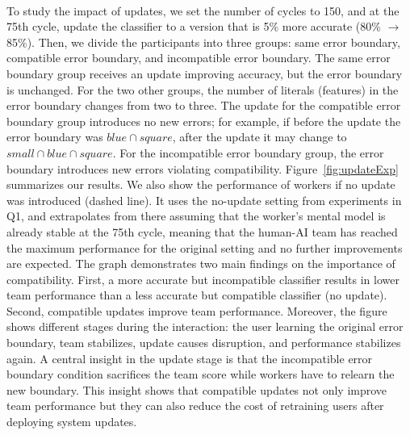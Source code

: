 \documentclass[letterpaper]{article} %
\newcommand{\bug}
    {\mbox{\rule{2mm}{2mm}}}
\newcommand{\Bug}[1]
    {\bug \footnote{BUG: {#1}}}
\newcommand{\?}{\mbox{?}}
\begin{document}
\\
\noindent To study the impact of updates, we set the number of cycles to 150, and at the 75th cycle, update the classifier to a version that is 5\% more accurate (80\% $\rightarrow$ 85\%). Then, we divide the participants into three groups: same error boundary,
compatible error boundary, and incompatible error boundary. The same error boundary group receives an update improving accuracy, but the  error boundary is unchanged. For the two other groups, the number of literals (features) in the error boundary changes from two to three. The update for the compatible error boundary group introduces no new errors; for example, if before the update the error boundary was $blue \cap square$, after the update it may change to $small \cap blue \cap square$. For the incompatible error boundary group, the error boundary introduces new errors violating compatibility. Figure~\ref{fig:updateExp} summarizes our results. We also show the performance of workers if no update was introduced (dashed line). It uses the no-update setting from experiments in Q1, and extrapolates from there assuming that the worker's mental model is already stable at the 75th cycle, meaning that the human-AI team has reached the maximum performance for the original setting and no further improvements are expected. The graph demonstrates two main findings on the importance of compatibility. First, a more accurate but incompatible classifier  results in lower team performance than a less accurate but compatible classifier (no update). Second, compatible updates improve team performance. Moreover, the figure shows different stages during the interaction: the user learning the original error boundary, team stabilizes, update causes disruption, and performance stabilizes again. A central insight in the update stage is that the incompatible error boundary condition sacrifices the team score while workers have to relearn the new boundary. This insight shows that compatible updates not only improve team performance but they can also reduce the cost of retraining users after deploying system updates.  
\end{document}
